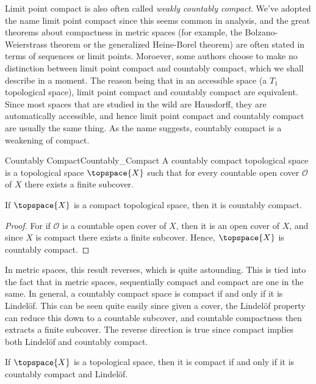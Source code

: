 \documentclass{article}                                                        %
\begin{document}
        Limit point compact is also often called
        \textit{weakly countably compact}. We've adopted the name limit point
        compact since this seems common in analysis, and the great theorems
        about compactness in metric spaces (for example, the Bolzano-Weierstrass
        theorem or the generalized Heine-Borel theorem) are often stated in
        terms of sequences or limit points. Moroever, some authors choose to
        make no distinction between limit point compact and countably compact,
        which we shall describe in a moment. The reason being that in an
        accessible space (a $T_{1}$ topological space), limit point compact and
        countably compact are equivalent. Since most spaces that are studied in
        the wild are Hausdorff, they are automatically accessible, and hence
        limit point compact and countably compact are usually the same thing.
        As the name suggests, countably compact is a weakening of compact.
        \begin{fdefinition}{Countably Compact}{Countably_Compact}
            A countably compact topological space is a topological space
            $\topspace{X}$ such that for every countable open cover
            $\mathcal{O}$ of $X$ there exists a finite subcover.
        \end{fdefinition}
        \begin{theorem}
            If $\topspace{X}$ is a compact topological space, then it is
            countably compact.
        \end{theorem}
        \begin{proof}
            For if $\mathcal{O}$ is a countable open cover of $X$, then it is
            an open cover of $X$, and since $X$ is compact there exists a finite
            subcover. Hence, $\topspace{X}$ is countably compact.
        \end{proof}
        In metric spaces, this result reverses, which is quite astounding. This
        is tied into the fact that in metric spaces, sequentially compact and
        compact are one in the same. In general, a countably compact space is
        compact if and only if it is Lindel\"{o}f. This can be seen quite easily
        since given a cover, the Lindel\"{o}f property can reduce this down to
        a countable subcover, and countable compactness then extracts a finite
        subcover. The reverse direction is true since compact implies both
        Lindel\"{o}f and countably compact.
        \begin{theorem}
            If $\topspace{X}$ is a topological space, then it is compact if and
            only if it is countably compact and Lindel\"{o}f.
        \end{theorem}
\end{document}
